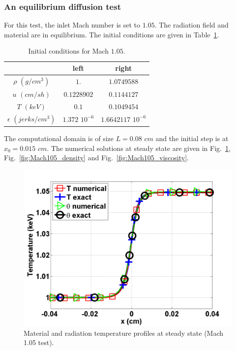 \documentclass[review]{elsarticle}
\newcommand{\fig}[1]{Fig.~\ref{#1}}                      %
\newcommand{\tbl}[1]{Table~\ref{#1}}                     %
\begin{document}
\subsubsection{An equilibrium diffusion test}

For this test, the inlet Mach number is set to $1.05$. The radiation field and material are in equilibrium. The initial conditions are given in \tbl{tbl:table3}.
\begin{table}[h]
\begin{center}
\caption{\label{tbl:table3} Initial conditions for Mach $1.05$.}
\begin{tabular}{|c|c|c|}
\hline 
 & left  & right \\ \hline
$\rho$ $(g/cm^3)$ &$1.$ & $1.0749588$ \\ \hline
$u$ $(cm/sh)$& $0.1228902$ & $0.1144127$ \\ \hline
$T$ $(keV)$& $0.1$ & $0.1049454$\\ \hline
$\epsilon$ $(jerks/cm^3)$ & $1.372$ $10^{-6}$ & $1.6642117$ $10^{-6}$\\
\hline
\end{tabular}
\end{center}  
\end{table}  
The computational domain is of size $L=0.08$ $cm$ and the initial step is at $x_0 = 0.015$ $cm$. The numerical solutions at steady state are given in \fig{fig:Mach105_temp}, \fig{fig:Mach105_density} and \fig{fig:Mach105_viscosity}. 
\begin{figure}[H]
                \centering
                \includegraphics[width=\textwidth]{figs/Mach_1p05_nel_500_temperature.png}
        \caption{Material and radiation temperature profiles at steady state (Mach 1.05 test).}\label{fig:Mach105_temp}
\end{figure}
\end{document}
